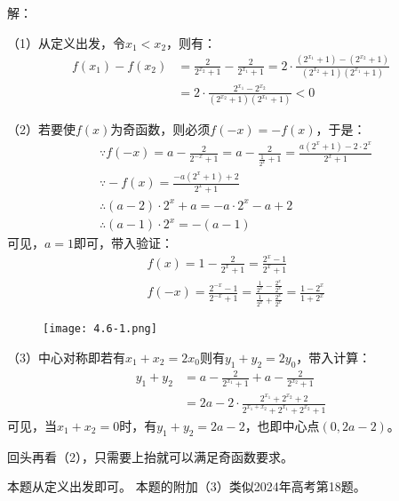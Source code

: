 解：

（1）从定义出发，令$x_1<x_2$，则有：
\begin{align*}
f\left( x_1 \right) -f\left( x_2 \right) &=\frac{2}{2^{x_2}+1}-\frac{2}{2^{x_1}+1}=2\cdot \frac{\left( 2^{x_1}+1 \right) -\left( 2^{x_2}+1 \right)}{\left( 2^{x_2}+1 \right) \left( 2^{x_1}+1 \right)} \\
&=2\cdot \frac{2^{x_1}-2^{x_2}}{\left( 2^{x_2}+1 \right) \left( 2^{x_1}+1 \right)}<0
\end{align*}

（2）若要使$f\left( x \right) $为奇函数，则必须$f\left( -x \right) =-f\left( x \right) $，于是：
\begin{align*}
&\because f\left( -x \right) =a-\frac{2}{2^{-x}+1}=a-\frac{2}{\frac{1}{2^x}+1}=\frac{a\left( 2^x+1 \right) -2\cdot 2^x}{2^x+1} \\
&\because -f\left( x \right) =\frac{-a\left( 2^x+1 \right) +2}{2^x+1} \\
&\therefore \left( a-2 \right) \cdot 2^x+a=-a\cdot 2^x-a+2 \\
&\therefore \left( a-1 \right) \cdot 2^x=-\left( a-1 \right)
\end{align*}
可见，$a=1$即可，带入验证：
\begin{align*}
&f\left( x \right) =1-\frac{2}{2^x+1}=\frac{2^x-1}{2^x+1} \\
&f\left( -x \right) =\frac{2^{-x}-1}{2^{-x}+1}=\frac{\frac{1}{2^x}-\frac{2^x}{2^x}}{\frac{1}{2^x}+\frac{2^x}{2^x}}=\frac{1-2^x}{1+2^x}
\end{align*}

\begin{figure}[h]
\centering
\texttt{[image: 4.6-1.png]}
\end{figure}

（3）中心对称即若有$x_1+x_2=2x_0$则有$y_1+y_2=2y_0$，带入计算：
\begin{align*}
y_1+y_2&=a-\frac{2}{2^{x_1}+1}+a-\frac{2}{2^{x_2}+1} \\
&=2a-2\cdot \frac{2^{x_1}+2^{x_2}+2}{2^{x_1+x_2}+2^{x_1}+2^{x_2}+1}
\end{align*}
可见，当$x_1+x_2=0$时，有$y_1+y_2=2a-2$，也即中心点$\left( 0,2a-2 \right) $。

回头再看（2），只需要上抬就可以满足奇函数要求。

\begin{tcolorbox}
本题从定义出发即可。
本题的附加（3）类似2024年高考第18题。
\end{tcolorbox}




